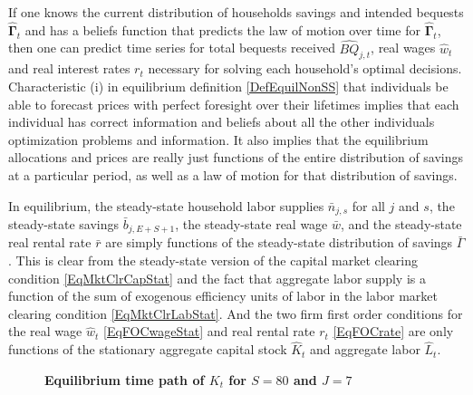     If one knows the current distribution of households savings and intended bequests $\bm{\hat{\Gamma}}_t$ and has a beliefs function that predicts the law of motion over time for $\bm{\hat{\Gamma}}_t$, then one can predict time series for total bequests received $\hat{BQ}_{j,t}$, real wages $\hat{w}_t$ and real interest rates $r_t$ necessary for solving each household's optimal decisions. Characteristic (i) in equilibrium definition \ref{DefEquilNonSS} that individuals be able to forecast prices with perfect foresight over their lifetimes implies that each individual has correct information and beliefs about all the other individuals optimization problems and information. It also implies that the equilibrium allocations and prices are really just functions of the entire distribution of savings at a particular period, as well as a law of motion for that distribution of savings.

    In equilibrium, the steady-state household labor supplies $\bar{n}_{j,s}$ for all $j$ and $s$, the steady-state savings $\bar{b}_{j,E+S+1}$, the steady-state real wage $\bar{w}$, and the steady-state real rental rate $\bar{r}$ are simply functions of the steady-state distribution of savings $\bar{\Gamma}$. This is clear from the steady-state version of the capital market clearing condition \eqref{EqMktClrCapStat} and the fact that aggregate labor supply is a function of the sum of exogenous efficiency units of labor in the labor market clearing condition \eqref{EqMktClrLabStat}. And the two firm first order conditions for the real wage $\hat{w}_t$ \eqref{EqFOCwageStat} and real rental rate $r_t$ \eqref{EqFOCrate} are only functions of the stationary aggregate capital stock $\hat{K}_t$ and aggregate labor $\hat{L}_t$.

    \begin{figure}[htb]\centering \captionsetup{width=4.0in}
      \caption{\label{FigKpathTPI}\textbf{Equilibrium time path of $K_t$ for $S=80$ and $J=7$}}
    \end{figure}


